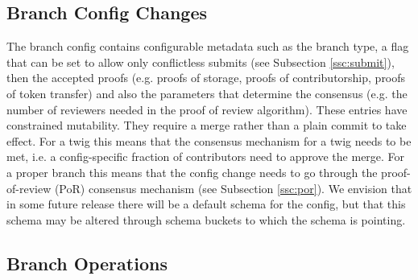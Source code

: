 \subsection{Branch Config Changes}
\label{ssc:configchange}

The branch config contains configurable metadata such as the branch type, a flag that can be set to allow only conflictless submits (see Subsection \ref{ssc:submit}), then the accepted proofs (e.g. proofs of storage, proofs of contributorship,  proofs of token transfer) and also the parameters that determine the consensus (e.g. the number of reviewers needed in the proof of review algorithm). These entries have constrained mutability. They require a merge rather than a plain commit to take effect. For a twig this means that the consensus mechanism for a twig needs to be met, i.e. a config-specific fraction of contributors need to approve the merge. For a proper branch this means that the config change needs to go through the proof-of-review (PoR) consensus mechanism (see Subsection \ref{ssc:por}). We envision that in some future release there will be a default schema for the config, but that this schema may be altered through schema buckets to which the schema is pointing.




\subsection{Branch Operations}
\label{ssc:branchops}


